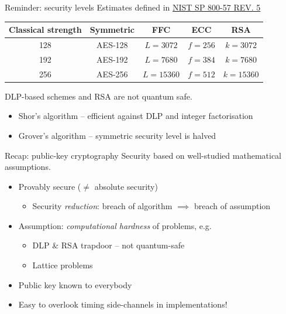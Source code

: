 \begin{frame}{Reminder: security levels}
  Estimates defined in \href{https://csrc.nist.gov/pubs/sp/800/57/pt1/r5/final}{NIST SP 800-57 REV. 5}

  \pause
  \begin{center}
  \begin{tabular}{@{}ccccc@{}}
    Classical strength & Symmetric & FFC & ECC & RSA\\
    \toprule
    128 & AES-128 & $L = 3072$  & $f = 256$ & $k = 3072$\\
    192 & AES-192 & $L = 7680$  & $f = 384$ & $k = 7680$\\
    256 & AES-256 & $L = 15360$ & $f = 512$ & $k = 15360$
  \end{tabular}
  \end{center}

  \pause
  DLP-based schemes and RSA are \alert{not quantum safe}.
  \pause
  \begin{itemize}
    \item Shor's algorithm -- efficient against DLP and integer factorisation
    \item Grover's algorithm -- symmetric security level is halved
  \end{itemize}
\end{frame}

\begin{frame}{Recap: public-key cryptography}
  Security based on well-studied mathematical assumptions.
  \begin{itemize}[<+(1)->]
    \item Provably secure ($\neq$ absolute security)
    \begin{itemize}
      \item Security \emph{reduction}: breach of algorithm $\implies$ breach of assumption
    \end{itemize}
    \item Assumption: \emph{computational hardness} of problems, e.g.
    \begin{itemize}
      \item DLP \& RSA trapdoor -- not quantum-safe
      \item Lattice problems
    \end{itemize}
    \item Public key known to everybody
    \item Easy to overlook timing side-channels in implementations!
  \end{itemize}
\end{frame}

